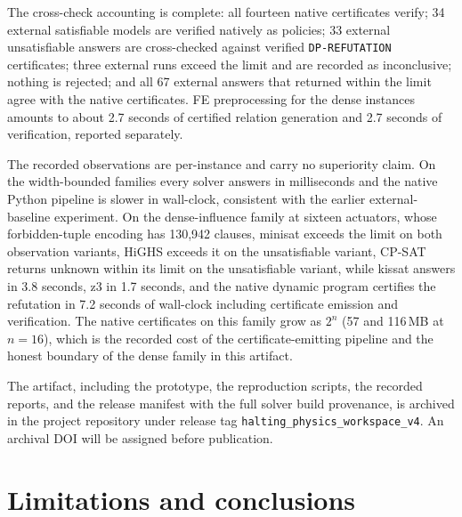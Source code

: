 \documentclass[11pt]{article}
\theoremstyle{plain}
\theoremstyle{definition}
\theoremstyle{remark}
\begin{document}
The cross-check accounting is complete: all fourteen native certificates
verify; 34 external satisfiable models are verified natively as policies;
33 external unsatisfiable answers are cross-checked against verified
\texttt{DP-REFUTATION} certificates; three external runs exceed the limit
and are recorded as inconclusive; nothing is rejected; and all 67 external
answers that returned within the limit agree with the native certificates.
FE preprocessing for the dense instances amounts to about 2.7 seconds of
certified relation generation and 2.7 seconds of verification, reported
separately.

The recorded observations are per-instance and carry no superiority claim.
On the width-bounded families every solver answers in milliseconds and the
native Python pipeline is slower in wall-clock, consistent with the earlier
external-baseline experiment.  On the dense-influence family at sixteen
actuators, whose forbidden-tuple encoding has 130{,}942 clauses, minisat
exceeds the limit on both observation variants, HiGHS exceeds it on the
unsatisfiable variant, CP-SAT returns unknown within its limit on the
unsatisfiable variant, while kissat answers in 3.8 seconds, z3 in 1.7
seconds, and the native dynamic program certifies the refutation in 7.2
seconds of wall-clock including certificate emission and verification.  The
native certificates on this family grow as \(2^{n}\) (57 and 116\,MB at
\(n{=}16\)), which is the recorded cost of the certificate-emitting
pipeline and the honest boundary of the dense family in this artifact.

The artifact, including the prototype, the reproduction scripts, the recorded
reports, and the release manifest with the full solver build provenance, is
archived in the project repository under release tag
\texttt{halting\_physics\_workspace\_v4}.  An archival DOI will be assigned
before publication.

\section{Limitations and conclusions}
\label{sec:limitations}
\end{document}
